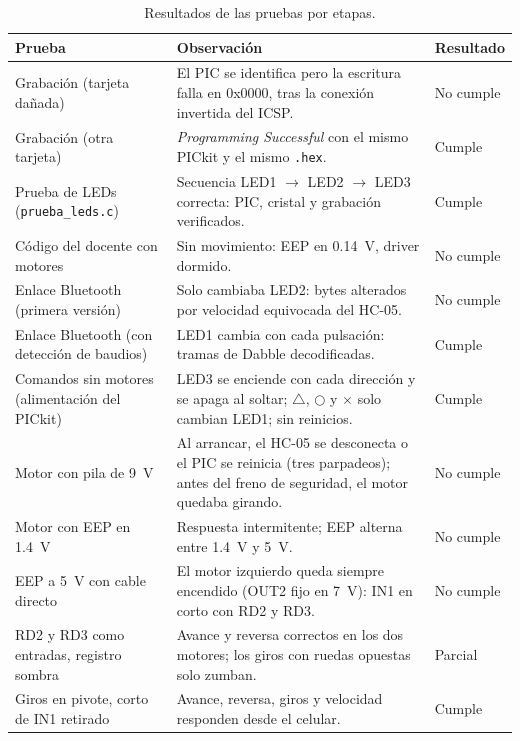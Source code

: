 \begin{table}[H]
  \centering
  \caption{Resultados de las pruebas por etapas.}
  \label{tab:resultados}
  \small
  \begin{tabularx}{\textwidth}{@{}>{\raggedright\arraybackslash}p{3.6cm} L l@{}}
    \toprule
    \textbf{Prueba} & \textbf{Observación} & \textbf{Resultado} \\
    \midrule
    Grabación (tarjeta dañada) & El PIC se identifica pero la escritura falla en 0x0000, tras la conexión invertida del ICSP. & No cumple \\
    Grabación (otra tarjeta) & \emph{Programming Successful} con el mismo PICkit y el mismo \texttt{.hex}. & Cumple \\
    Prueba de LEDs (\texttt{prueba\_leds.c}) & Secuencia LED1 $\rightarrow$ LED2 $\rightarrow$ LED3 correcta: PIC, cristal y grabación verificados. & Cumple \\
    Código del docente con motores & Sin movimiento: EEP en \SI{0.14}{\volt}, driver dormido. & No cumple \\
    Enlace Bluetooth (primera versión) & Solo cambiaba LED2: bytes alterados por velocidad equivocada del HC-05. & No cumple \\
    Enlace Bluetooth (con detección de baudios) & LED1 cambia con cada pulsación: tramas de Dabble decodificadas. & Cumple \\
    Comandos sin motores (alimentación del PICkit) & LED3 se enciende con cada dirección y se apaga al soltar; $\triangle$, $\bigcirc$ y $\times$ solo cambian LED1; sin reinicios. & Cumple \\
    Motor con pila de \SI{9}{\volt} & Al arrancar, el HC-05 se desconecta o el PIC se reinicia (tres parpadeos); antes del freno de seguridad, el motor quedaba girando. & No cumple \\
    Motor con EEP en \SI{1.4}{\volt} & Respuesta intermitente; EEP alterna entre \SI{1.4}{\volt} y \SI{5}{\volt}. & No cumple \\
    EEP a \SI{5}{\volt} con cable directo & El motor izquierdo queda siempre encendido (OUT2 fijo en \SI{7}{\volt}): IN1 en corto con RD2 y RD3. & No cumple \\
    RD2 y RD3 como entradas, registro sombra & Avance y reversa correctos en los dos motores; los giros con ruedas opuestas solo zumban. & Parcial \\
    Giros en pivote, corto de IN1 retirado & Avance, reversa, giros y velocidad responden desde el celular. & Cumple \\
    \bottomrule
  \end{tabularx}
\end{table}

